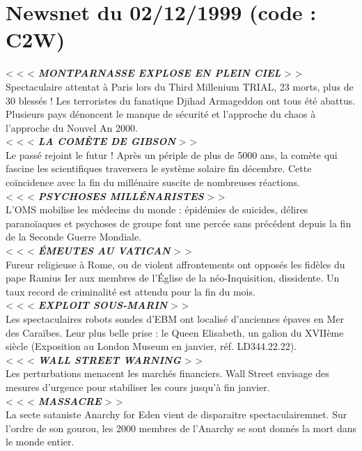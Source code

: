 \documentclass[11pt,twoside,a4paper]{book}
\begin{document}
\section*{Newsnet du 02/12/1999 (code : C2W)}

< < <  \textbf{\textit{MONTPARNASSE EXPLOSE EN PLEIN CIEL}} > >~\\
Spectaculaire attentat {\`a} Paris lors du Third Millenium TRIAL, 23 morts, plus de 30 bless{\'e}s ! Les terroristes du fanatique Djihad Armageddon ont tous {\'e}t{\'e} abattus. Plusieurs pays d{\'e}noncent le manque de s{\'e}curit{\'e} et l'approche du chaos {\`a} l'approche du Nouvel An 2000.~\\
< < <  \textbf{\textit{LA COM{\`E}TE DE GIBSON}} > >~\\
Le pass{\'e} rejoint le futur ! Apr{\`e}s un p{\'e}riple de plus de 5000 ans, la com{\`e}te qui fascine les scientifiques traversera le syst{\`e}me solaire fin d{\'e}cembre. Cette co{\"i}ncidence avec la fin du mill{\'e}naire suscite de nombreuses r{\'e}actions.~\\
< < <  \textbf{\textit{PSYCHOSES MILL{\'E}NARISTES}} > >~\\
L'OMS mobilise les m{\'e}decins du monde : {\'e}pid{\'e}mies de suicides, d{\'e}lires parano{\"i}aques et psychoses de groupe font une perc{\'e}e sans pr{\'e}c{\'e}dent depuis la fin de la Seconde Guerre Mondiale.~\\
< < <  \textbf{\textit{{\'E}MEUTES AU VATICAN}} > >~\\
Fureur religieuse {\`a} Rome, ou de violent affrontements ont oppos{\'e}s les fid{\`e}les du pape Ramius Ier aux membres de l'{\'E}glise de la n{\'e}o-Inquisition, dissidente. Un taux record de criminalit{\'e} est attendu pour la fin du mois.~\\
< < <  \textbf{\textit{EXPLOIT SOUS-MARIN}} > >~\\
Les spectaculaires robots sondes d'EBM ont localis{\'e} d'anciennes {\'e}paves en Mer des Cara{\"i}bes. Leur plus belle prise : le Queen Elisabeth, un galion du XVII{\`e}me si{\`e}cle (Exposition au London Museum en janvier, r{\'e}f. LD344.22.22).~\\
< < <  \textbf{\textit{WALL STREET WARNING}} > >~\\
Les perturbations menacent les march{\'e}s financiers. Wall Street envisage des mesures d'urgence pour stabiliser les cours jusqu'{\`a} fin janvier.~\\
< < <  \textbf{\textit{MASSACRE}} > >~\\
La secte sataniste Anarchy for Eden vient de disparaitre spectaculairemnet. Sur l'ordre de son gourou, les 2000 membres de l'Anarchy se sont donn{\'e}s la mort dans le monde entier.~\\
\end{document}
